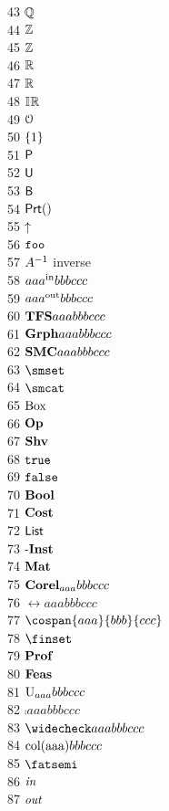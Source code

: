 \documentclass[11pt, book]{memoir}
\theoremstyle{plain}
\theoremstyle{plain}
\theoremstyle{remark}
\begin{document}
 43 $\mathbb{Q}$ \\
 44 $\mathbb{Z}$ \\
 45 $\mathbb{Z}$ \\
 46 $\mathbb{R}$ \\
 47 $\mathbb{R}$ \\
 48 $\mathbb{I}\hspace{.6pt}\mathbb{R}$ \\
 49 $\mathcal{O}$ \\
 50 $\{1\}$ \\
 51 $\mathsf{P}$ \\
 52 $\mathsf{U}$ \\
 53 $\mathsf{B}$ \\
 54 $\prt$ \\
 55 $\mathop{\uparrow}$ \\
 56 $\mathtt{foo}$ \\
 57 $A^{-1}$ inverse\\
 58 $aaa^{\textnormal{in}}{bbb}{ccc}$ \\
 59 $aaa^{\textnormal{out}}{bbb}{ccc}$ \\
 60 $\mathbf{TFS}{aaa}{bbb}{ccc}$ \\
 61 $\mathbf{Grph}{aaa}{bbb}{ccc}$ \\
 62 $\mathbf{SMC}{aaa}{bbb}{ccc}$ \\
 63 $\smset$ \\
 64 $\smcat$ \\
 65 $\mathrm{Box}$ \\
 66 $\mathbf{Op}$ \\
 67 $\mathbf{Shv}$ \\
 68 $\mathtt{true}$ \\
 69 $\mathtt{false}$ \\
 70 $\mathbf{Bool}$ \\
 71 $\mathbf{Cost}$ \\
 72 $\mathsf{List}$ \\
 73 $\textnormal{-}\mathbf{Inst}$ \\
 74 $\mathbf{Mat}$ \\
 75 $\mathbf{Corel}_{aaa}{bbb}{ccc}$ \\
 76 $\rel{aaa}{bbb}{ccc}$ \\
 77 $\cospan{aaa}{bbb}{ccc}$ \\
 78 $\finset$ \\
 79 $\mathbf{Prof}$ \\
 80 $\mathbf{Feas}$ \\
 81 $\mathrm{U}_{aaa}{bbb}{ccc}$ \\
 82 $\comp{aaa}{bbb}{ccc}$ \\
 83 $\conj{aaa}{bbb}{ccc}$ \\
 84 $\mathrm{col(aaa)}{bbb}{ccc}$ \\
 85 $\cp$ \\
 86 $\textit{in}$ \\
 87 $\textit{out}$ \\
\end{document}
